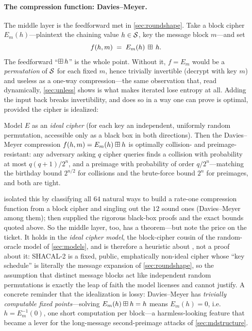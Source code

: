 \paragraph{The compression function: Davies--Meyer.} The middle layer is
the feedforward met in \cref{sec:roundshape}. Take a block cipher
$E_m(h)$---plaintext the chaining value $h\in\mathcal{S}$, key the message
block $m$---and set
\[
  f(h,m) \;=\; E_m(h) \,\boxplus\, h .
\]
The feedforward ``$\boxplus\,h$'' is the whole point. Without it,
$f = E_m$ would be a \emph{permutation} of $\mathcal{S}$ for each fixed $m$,
hence trivially invertible (decrypt with key $m$) and useless as a
one-way compression---the same observation that, read dynamically,
\cref{sec:unless} shows is what makes iterated \SHA{} lose entropy at
all. Adding the input back breaks invertibility, and does so in a way one
can prove is optimal, provided the cipher is idealized:

\begin{theorem}
\label{thm:dm}
Model $E$ as an \emph{ideal cipher} (for each key an independent, uniformly
random permutation, accessible only as a black box in both directions).
Then the Davies--Meyer compression $f(h,m)=E_m(h)\boxplus h$ is optimally
collision- and preimage-resistant: any adversary asking $q$ cipher
queries finds a collision with probability at most $q(q+1)/2^{n}$, and a
preimage with probability of order $q/2^{n}$---matching the birthday
bound $2^{n/2}$ for collisions and the brute-force bound $2^{n}$ for
preimages, and both are tight.
\end{theorem}

\citet{PGV1993} isolated this by classifying all $64$ natural ways to
build a rate-one compression function from a block cipher and singling
out the $12$ sound ones (Davies--Meyer among them); \citet{BRS2002} then
supplied the rigorous black-box proofs and the exact bounds quoted above.
So the middle layer, too, has a theorem---but note the price on the
ticket. It holds in the \emph{ideal cipher model}, the block-cipher
cousin of the random-oracle model of \cref{sec:models}, and is therefore
a heuristic about \SHA{}, not a proof about it: SHACAL-2 is a fixed, public,
emphatically non-ideal cipher whose ``key schedule'' is literally the
message expansion of \cref{sec:roundshape}, so the assumption that
distinct message blocks act like independent random permutations is
exactly the leap of faith the model licenses and cannot justify. A
concrete reminder that the idealization is lossy: Davies--Meyer has
\emph{trivially computable fixed points}---solving $E_m(h)\boxplus h = h$
means $E_m(h)=0$, i.e.\ $h = E_m^{-1}(0)$, one short computation per
block---a harmless-looking feature that became a lever for the
long-message second-preimage attacks of \cref{sec:mdstructure}.

